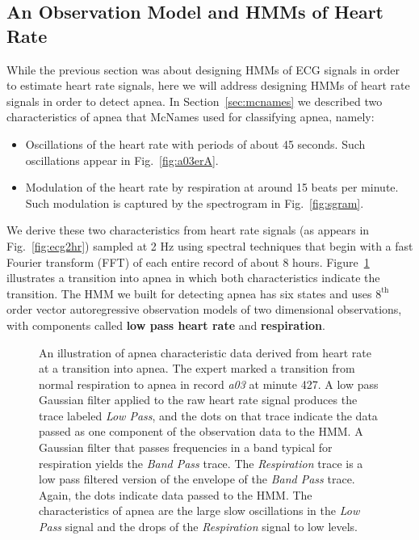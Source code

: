 \afterpage{\clearpage}%

\subsection{An Observation Model and HMMs of Heart Rate}
\label{sec:apnea_observation_model}

While the previous section was about designing HMMs of ECG signals in
order to estimate heart rate signals, here we will address designing
HMMs of heart rate signals in order to detect apnea.  In
Section~\ref{sec:mcnames} we described two characteristics of apnea
that McNames used for classifying apnea, namely:
\begin{itemize}
\item Oscillations of the heart rate with periods of about 45 seconds.
  Such oscillations appear in Fig.~\ref{fig:a03erA}.
\item Modulation of the heart rate by respiration at around 15 beats
  per minute. Such modulation is captured by the spectrogram in
  Fig.~\ref{fig:sgram}.
\end{itemize}
We derive these two characteristics from heart rate signals (as appears
in Fig.~\ref{fig:ecg2hr}) sampled at 2 Hz using spectral techniques
that begin with a fast Fourier transform (FFT) of each entire record
of about 8 hours.  Figure~\ref{fig:explore} illustrates a transition into apnea
in which both characteristics indicate the transition.  The HMM we
built for detecting apnea has six states and uses $8^{\text{th}}$
order vector autoregressive observation models of two dimensional
observations, with components called \textbf{low pass heart rate} and
\textbf{respiration}.

\begin{figure}
  \caption[Apnea characteristics derived from estimated heart rate
  signal.]{An illustration of apnea characteristic data derived from
    heart rate at a transition into apnea.  The expert marked a
    transition from normal respiration to apnea in record \emph{a03}
    at minute 427.  A low pass Gaussian filter applied to the raw
    heart rate signal produces the trace labeled \emph{Low Pass}, and
    the dots on that trace indicate the data passed as one component
    of the observation data to the HMM.  A Gaussian filter that passes
    frequencies in a band typical for respiration yields the
    \emph{Band Pass} trace.  The \emph{Respiration} trace is a low
    pass filtered version of the envelope of the \emph{Band Pass}
    trace.  Again, the dots indicate data passed to the HMM.  The
    characteristics of apnea are the large slow oscillations in the
    \emph{Low Pass} signal and the drops of the \emph{Respiration}
    signal to low levels.}
  \label{fig:explore}
\end{figure}

